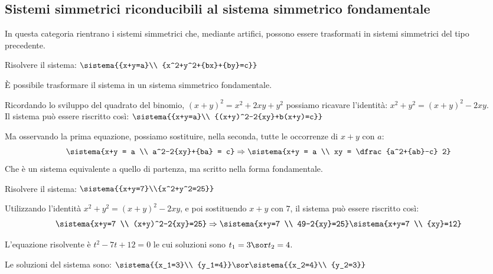 \subsection{Sistemi simmetrici riconducibili al sistema simmetrico 
fondamentale}
In questa categoria rientrano i sistemi simmetrici che, mediante artifici, 
possono essere trasformati in sistemi simmetrici del tipo precedente.

\begin{esempio}{}{}
Risolvere il sistema: \quad 
\(\sistema{{x+y=a}\\
{x^2+y^2+{bx}+{by}=c}}\)

\medskip
È possibile trasformare il sistema in un sistema simmetrico fondamentale.

Ricordando lo sviluppo del quadrato del binomio, 
\((x +y)^2 = x^2 +2xy +y^2\) possiamo ricavare l'identità: \quad 
\(x^2+y^2=(x+y)^2-2{xy}\). \\[1mm]
Il sistema può essere riscritto così: \quad
\(\sistema{{x+y=a}\\
{(x+y)^2-2{xy}+b(x+y)=c}}\)

Ma osservando la prima equazione, possiamo sostituire, nella seconda, 
tutte le occorrenze di \(x +y\) con \(a\):
\[\sistema{x+y = a \\ a^2-2{xy}+{ba} = c} \Rightarrow 
  \sistema{x+y = a \\ xy = \dfrac{a^2+{ab}-c} 2}\]
Che è un sistema equivalente a quello di partenza, ma scritto nella forma 
fondamentale.
\end{esempio}

\begin{esempio}{}{}
Risolvere il sistema: \quad 
\(\sistema{{x+y=7}\\{x^2+y^2=25}}\)

Utilizzando l'identità \(x^2+y^2 = (x+y)^2-2{xy}\), e poi sostituendo 
\(x +y\) con \(7\), il sistema può essere riscritto così: 
\[\sistema{x+y=7 \\ (x+y)^2-2{xy}=25} \Rightarrow 
  \sistema{x+y=7 \\ 49-2{xy}=25}
\sistema{x+y=7 \\ {xy}=12}\]

L'equazione risolvente è \(t^2-7t+12=0\) le cui soluzioni sono 
\(t_1=3 \sor t_2=4\).

Le soluzioni del sistema sono: \quad
\(\sistema{{x_1=3}\\
{y_1=4}} \sor \sistema{{x_2=4}\\
{y_2=3}}\)
\end{esempio}

